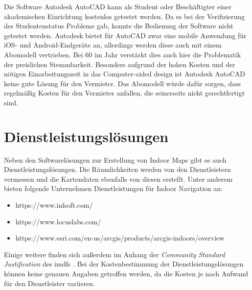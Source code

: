 {}{
Die Software Autodesk AutoCAD kann als Student oder Beschäftigter einer akademischen Einrichtung kostenlos getestet werden.
Da es bei der Verifizierung des Studentenstatus Probleme gab, konnte die Bedienung der Software nicht getestet werden.
}{
Autodesk bietet für AutoCAD zwar eine mobile Anwendung für iOS- und Android-Endgeräte an, allerdings werden diese auch mit einem Abomodell vertrieben.
Bei 60  im Jahr \parencite{AUT2020} verstärkt dies auch hier die Problematik der preislichen Stemmbarkeit.
}{
Besonders aufgrund der hohen Kosten und der nötigen Einarbeitungszeit in das Computer-aided design ist Autodesk AutoCAD keine gute Lösung für den Vermieter.
Das Abomodell würde dafür sorgen, dass regelmäßig Kosten für den Vermieter anfallen, die seinerseits nicht gerechtfertigt sind.
}

\section{Dienstleistungslösungen}
Neben den Softwarelösungen zur Erstellung von Indoor Maps gibt es auch Dienstleistungslösungen.
Die Räumlichkeiten werden von den Dienstleistern vermessen und die Kartendaten ebenfalls von diesen erstellt.
Unter anderem bieten folgende Unternehmen Dienstleistungen für Indoor Navigation an:
\begin{itemize}
	\item https://www.infsoft.com/
	\item https://www.locuslabs.com/
	\item https://www.esri.com/en-us/arcgis/products/arcgis-indoors/overview
\end{itemize}
Einige weitere finden sich außerdem im Anhang der \emph{Community Standard Justification} des \acl{imdf}s \parencite{HOA2019}.
Bei der Kostenbestimmung der Dienstleistungslösungen können keine genauen Angaben getroffen werden, da die Kosten je nach Aufwand für den Dienstleister variieren.

